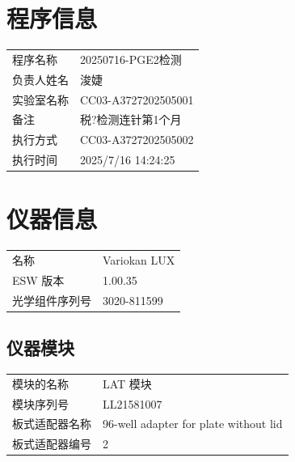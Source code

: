\documentclass[UTF8,10pt,a4paper,fontset=fandol]{ctexart}
\newcommand{\fieldvalue}[1]{#1}
\begin{document}
\section{程序信息}

\begin{tabular}{@{}ll@{}}
程序名称 &
\fieldvalue{20250716-PGE2检测}\\
负责人姓名 &
\fieldvalue{浚婕}\\
实验室名称 &
\fieldvalue{CC03-A3727202505001}\\
备注 &
\fieldvalue{税?检测连针第1个月}\\
执行方式 &
\fieldvalue{CC03-A3727202505002}\\
执行时间 &
\fieldvalue{2025/7/16 14:24:25}
\end{tabular}

\section{仪器信息}

\begin{tabular}{@{}ll@{}}
名称 &
\fieldvalue{Variokan LUX}\\
ESW 版本 &
\fieldvalue{1.00.35}\\
光学组件序列号 &
\fieldvalue{3020-811599}
\end{tabular}

\subsection{仪器模块}

\begin{tabular}{@{}ll@{}}
模块的名称 &
\fieldvalue{LAT 模块}\\
模块序列号 &
\fieldvalue{LL21581007}\\
板式适配器名称 &
\fieldvalue{96-well adapter for plate without lid}\\
板式适配器编号 &
\fieldvalue{2}\\
\end{tabular}
\end{document}
